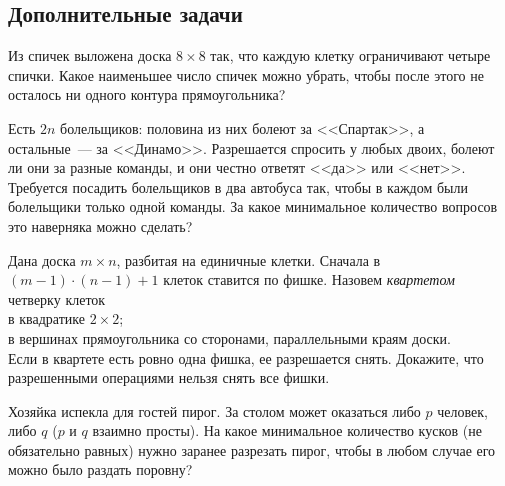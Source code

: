 

\subsection*{Дополнительные задачи}



\begin{problems}

\item
Из спичек выложена доска $8 \times 8$ так, что каждую клетку ограничивают
четыре спички.
Какое наименьшее число спичек можно убрать, чтобы после этого не осталось
ни одного контура прямоугольника?

\item
Есть $2 n$ болельщиков: половина из них болеют за <<Спартак>>, а остальные~---
за <<Динамо>>.
Разрешается спросить у любых двоих, болеют ли они за разные команды, и они
честно ответят <<да>> или <<нет>>.
Требуется посадить болельщиков в два автобуса так, чтобы в каждом были
болельщики только одной команды.
За какое минимальное количество вопросов это наверняка можно сделать?

\item
Дана доска $m \times n$, разбитая на единичные клетки.
Сначала в $(m - 1) \cdot (n - 1) + 1$ клеток ставится по фишке.
Назовем \emph{квартетом} четверку клеток
\\
\subproblem в квадратике $2 \times 2$;
\\
\subproblem в вершинах прямоугольника со сторонами, параллельными краям доски.
\\
Если в квартете есть ровно одна фишка, ее разрешается снять.
Докажите, что разрешенными операциями нельзя снять все фишки.

\item
Хозяйка испекла для гостей пирог.
За столом может оказаться либо $p$ человек, либо $q$
($p$ и $q$ взаимно просты).
На какое минимальное количество кусков (не обязательно равных) нужно заранее
разрезать пирог, чтобы в любом случае его можно было раздать поровну?

\end{problems}

